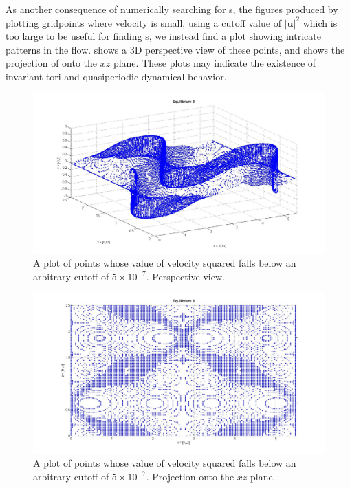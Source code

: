 \documentclass[letter,10pt,openany]{article}
\begin{document}
As another consequence of
numerically searching for \stagp s, the figures produced by
plotting gridpoints where velocity is small, using a cutoff
value of $|\mathbf{u}|^{2}$ which is too large to be useful for
finding \stagp s, we instead find a plot showing
intricate patterns in the flow.  shows a 3D
perspective view of these points, and
shows the projection of  onto the $xz$ plane. These plots may indicate the existence of invariant tori and quasiperiodic dynamical behavior. \\

\begin{figure}[!h]
\includegraphics[width=1.0\textwidth]{usquare_EQ8_cute1.jpg}
  \caption{
   A plot of points whose value of velocity squared falls below an
   arbitrary cutoff of $5\times 10^{-7}$. Perspective view.
   }
  \label{eltonFig:usquare_EQ8_1}
 \end{figure}

 \begin{figure}[!h]
\includegraphics[width=1.0\textwidth]{usquare_EQ8_cute2.jpg}
  \caption{
   A plot of points whose value of velocity squared falls below an
   arbitrary cutoff of $5\times 10^{-7}$. Projection onto the $xz$
   plane.
   }
  \label{eltonFig:usquare_EQ8_2}
 \end{figure}
\end{document}
